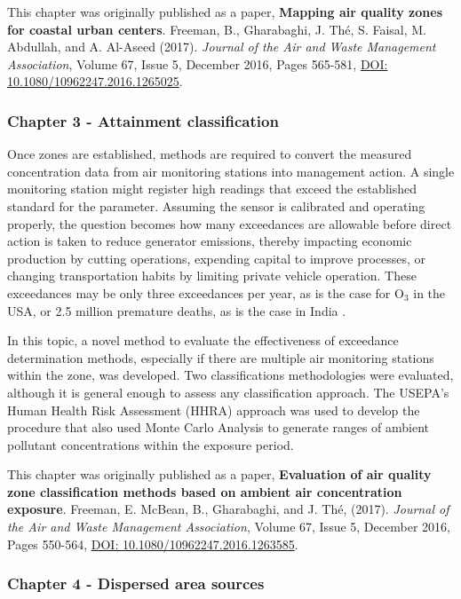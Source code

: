 This chapter was originally published as a paper, \textbf{Mapping air quality zones for coastal urban centers}. Freeman, B., Gharabaghi, J.  Th\'e, S. Faisal, M. Abdullah, and A. Al-Aseed (2017). \textit{Journal of the Air and Waste Management Association}, Volume 67, Issue 5, December 2016, Pages 565-581, \url{ DOI: 10.1080/10962247.2016.1265025}.

\subsubsection*{Chapter 3 - Attainment classification}

Once zones are established, methods are required to convert the measured concentration data from air monitoring stations into management action. A single monitoring station might register high readings that exceed the established standard for the parameter. Assuming the sensor is calibrated and operating properly, the question becomes how many exceedances are allowable before direct action is taken to reduce generator emissions, thereby impacting economic production by cutting operations, expending capital to improve processes, or changing transportation habits by limiting private vehicle operation. These exceedances may be only three exceedances per year, as is the case for O$_{3}$ in the USA, or 2.5 million premature deaths, as is the case in India \citep{Landrigan2017}.

In this topic,  a novel method to evaluate the effectiveness of exceedance determination methods, especially if there are multiple air monitoring stations within the zone, was developed. Two classifications methodologies were evaluated, although it is general enough to assess any classification approach. The USEPA's Human Health Risk Assessment (HHRA) approach was used to develop the procedure that also used Monte Carlo Analysis to generate ranges of ambient pollutant concentrations within the exposure period.

This chapter was originally published as a paper, \textbf{Evaluation of air quality zone classification methods based on ambient air concentration exposure}. Freeman, E. McBean, B., Gharabaghi, and J.  Th\'e, (2017). \textit{Journal of the Air and Waste Management Association}, Volume 67, Issue 5, December 2016, Pages 550-564, \url{DOI: 10.1080/10962247.2016.1263585}.

\subsubsection*{Chapter 4 - Dispersed area sources}

